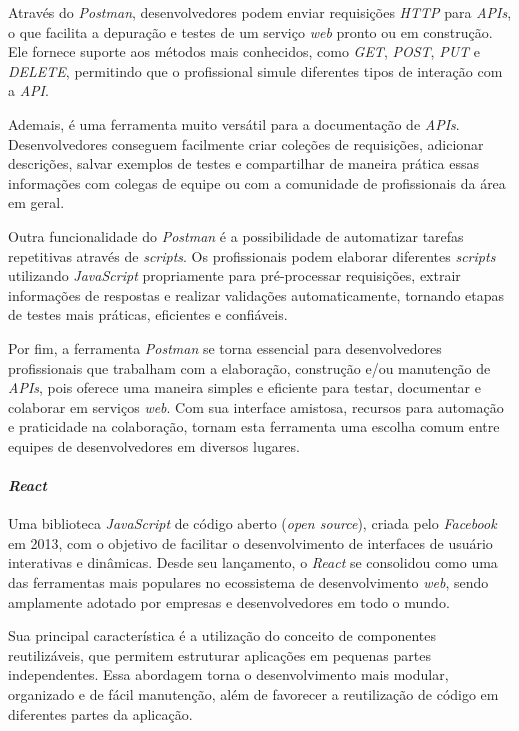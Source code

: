 \documentclass[english,brazilian]{UNISINOSartigo} %
\begin{document}
Através do \textit{Postman}, desenvolvedores podem enviar requisições \textit{HTTP} para \textit{APIs}, o que facilita a depuração e testes de um serviço \textit{web} pronto ou em construção. Ele fornece suporte aos métodos mais conhecidos, como \textit{GET}, \textit{POST}, \textit{PUT} e \textit{DELETE}, permitindo que o profissional simule diferentes tipos de interação com a \textit{API}.

Ademais, é uma ferramenta muito versátil para a documentação de \textit{APIs}. Desenvolvedores conseguem facilmente criar coleções de requisições, adicionar descrições, salvar exemplos de testes e compartilhar de maneira prática essas informações com colegas de equipe ou com a comunidade de profissionais da área em geral.

Outra funcionalidade do \textit{Postman} é a possibilidade de automatizar tarefas repetitivas através de \textit{scripts}. Os profissionais podem elaborar diferentes \textit{scripts} utilizando \textit{JavaScript} propriamente para pré-processar requisições, extrair informações de respostas e realizar validações automaticamente, tornando etapas de testes mais práticas, eficientes e confiáveis.

Por fim, a ferramenta \textit{Postman} se torna essencial para desenvolvedores profissionais que trabalham com a elaboração, construção e/ou manutenção de \textit{APIs}, pois oferece uma maneira simples e eficiente para testar, documentar e colaborar em serviços \textit{web}. Com sua interface amistosa, recursos para automação e praticidade na colaboração, tornam esta ferramenta uma escolha comum entre equipes de desenvolvedores em diversos lugares.

\paragraph{\textit{React}}

Uma biblioteca \textit{JavaScript} de código aberto (\textit{open source}), criada pelo \textit{Facebook} em 2013, com o objetivo de facilitar o desenvolvimento de interfaces de usuário interativas e dinâmicas. Desde seu lançamento, o \textit{React} se consolidou como uma das ferramentas mais populares no ecossistema de desenvolvimento \textit{web}, sendo amplamente adotado por empresas e desenvolvedores em todo o mundo.

Sua principal característica é a utilização do conceito de componentes reutilizáveis, que permitem estruturar aplicações em pequenas partes independentes. Essa abordagem torna o desenvolvimento mais modular, organizado e de fácil manutenção, além de favorecer a reutilização de código em diferentes partes da aplicação.
\end{document}
